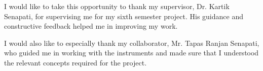 \begin{acknowledgements}
\addchaptertocentry{\acknowledgementname}
I would like to take this opportunity to thank my supervisor, Dr. Kartik Senapati, for supervising me for my sixth semester project. His guidance and constructive feedback helped me in improving my work.

I would also like to especially thank my collaborator, Mr. Tapas Ranjan Senapati, who guided me in working with the instruments and made sure that I understood the relevant concepts required for the project.


\end{acknowledgements}

